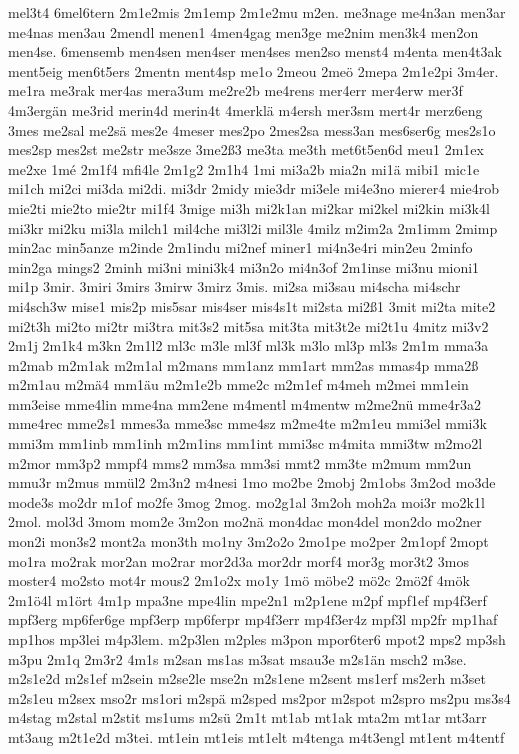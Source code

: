 {mel3t4
6mel6tern
2m1e2mis
2m1emp
2m1e2mu
m2en.
me3nage
me4n3an
men3ar
me4nas
men3au
2mendl
menen1
4men4gag
men3ge
me2nim
men3k4
men2on
men4se.
6mensemb
men4sen
men4ser
men4ses
men2so
menst4
m4enta
men4t3ak
ment5eig
men6t5ers
2mentn
ment4sp
me1o
2meou
2meö
2mepa
2m1e2pi
3m4er.
me1ra
me3rak
mer4as
mera3um
me2re2b
me4rens
mer4err
mer4erw
mer3f
4m3ergän
me3rid
merin4d
merin4t
4merklä
m4ersh
mer3sm
mert4r
merz6eng
3mes
me2sal
me2sä
mes2e
4meser
mes2po
2mes2sa
mess3an
mes6ser6g
mes2s1o
mes2sp
mes2st
me2str
me3sze
3me2ß3
me3ta
me3th
met6t5en6d
meu1
2m1ex
me2xe
1mé
2m1f4
mfi4le
2m1g2
2m1h4
1mi
mi3a2b
mia2n
mi1ä
mibi1
mic1e
mi1ch
mi2ci
mi3da
mi2di.
mi3dr
2midy
mie3dr
mi3ele
mi4e3no
mierer4
mie4rob
mie2ti
mie2to
mie2tr
mi1f4
3mige
mi3h
mi2k1an
mi2kar
mi2kel
mi2kin
mi3k4l
mi3kr
mi2ku
mi3la
milch1
mil4che
mi3l2i
mil3le
4milz
m2im2a
2m1imm
2mimp
min2ac
min5anze
m2inde
2m1indu
mi2nef
miner1
mi4n3e4ri
min2eu
2minfo
min2ga
mings2
2minh
mi3ni
mini3k4
mi3n2o
mi4n3of
2m1inse
mi3nu
mioni1
mi1p
3mir.
3miri
3mirs
3mirw
3mirz
3mis.
mi2sa
mi3sau
mi4scha
mi4schr
mi4sch3w
mise1
mis2p
mis5sar
mis4ser
mis4s1t
mi2sta
mi2ß1
3mit
mi2ta
mite2
mi2t3h
mi2to
mi2tr
mi3tra
mit3s2
mit5sa
mit3ta
mit3t2e
mi2t1u
4mitz
mi3v2
2m1j
2m1k4
m3kn
2m1l2
ml3c
m3le
ml3f
ml3k
m3lo
ml3p
ml3s
2m1m
mma3a
m2mab
m2m1ak
m2m1al
m2mans
mm1anz
mm1art
mm2as
mmas4p
mma2ß
m2m1au
m2mä4
mm1äu
m2m1e2b
mme2c
m2m1ef
m4meh
m2mei
mm1ein
mm3eise
mme4lin
mme4na
mm2ene
m4mentl
m4mentw
m2me2nü
mme4r3a2
mme4rec
mme2s1
mmes3a
mme3sc
mme4sz
m2me4te
m2m1eu
mmi3el
mmi3k
mmi3m
mm1inb
mm1inh
m2m1ins
mm1int
mmi3sc
m4mita
mmi3tw
m2mo2l
m2mor
mm3p2
mmpf4
mms2
mm3sa
mm3si
mmt2
mm3te
m2mum
mm2un
mmu3r
m2mus
mmül2
2m3n2
m4nesi
1mo
mo2be
2mobj
2m1obs
3m2od
mo3de
mode3s
mo2dr
m1of
mo2fe
3mog
2mog.
mo2g1al
3m2oh
moh2a
moi3r
mo2k1l
2mol.
mol3d
3mom
mom2e
3m2on
mo2nä
mon4dac
mon4del
mon2do
mo2ner
mon2i
mon3s2
mont2a
mon3th
mo1ny
3m2o2o
2mo1pe
mo2per
2m1opf
2mopt
mo1ra
mo2rak
mor2an
mo2rar
mor2d3a
mor2dr
morf4
mor3g
mor3t2
3mos
moster4
mo2sto
mot4r
mous2
2m1o2x
mo1y
1mö
möbe2
mö2c
2mö2f
4mök
2m1ö4l
m1ört
4m1p
mpa3ne
mpe4lin
mpe2n1
m2p1ene
m2pf
mpf1ef
mp4f3erf
mpf3erg
mp6fer6ge
mpf3erp
mp6ferpr
mp4f3err
mp4f3er4z
mpf3l
mp2fr
mp1haf
mp1hos
mp3lei
m4p3lem.
m2p3len
m2ples
m3pon
mpor6ter6
mpot2
mps2
mp3sh
m3pu
2m1q
2m3r2
4m1s
m2san
ms1as
m3sat
msau3e
m2s1än
msch2
m3se.
m2s1e2d
m2s1ef
m2sein
m2se2le
mse2n
m2s1ene
m2sent
ms1erf
ms2erh
m3set
m2s1eu
m2sex
mso2r
ms1ori
m2spä
m2sped
ms2por
m2spot
m2spro
ms2pu
ms3s4
m4stag
m2stal
m2stit
ms1ums
m2sü
2m1t
mt1ab
mt1ak
mta2m
mt1ar
mt3arr
mt3aug
m2t1e2d
m3tei.
mt1ein
mt1eis
mt1elt
m4tenga
m4t3engl
mt1ent
m4tentf
}

